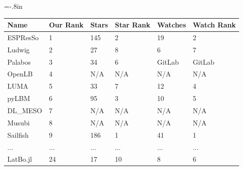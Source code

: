 \documentclass[usenames,dvipsnames]{beamer}
\begin{document}
\hoffset=-.8in %
\begin{frame}[plain]


\begin{tabular}{ p{2.15cm}p{1.25cm}p{1.75cm}p{1.5cm}p{1.75cm}p{1.5cm} }
  \toprule
  Name & Our Rank & Stars & Star Rank &
  Watches & Watch Rank\\
  \midrule
  ESPResSo & 1 & 145 & 2 & 19& 2\\
  Ludwig & 2 & 27 & 8 & 6& 7\\
  Palabos & 3 & 34 & 6 & GitLab& GitLab\\
  OpenLB & 4 & N/A & N/A & N/A& N/A\\
  LUMA & 5 & 33 & 7 & 12& 4\\
  pyLBM & 6 & 95 & 3 & 10& 5\\
  DL\_MESO & 7 & N/A & N/A & N/A & N/A\\
  Musubi & 8 & N/A & N/A & N/A & N/A\\
  Sailfish & 9 & 186 & 1 & 41& 1\\
  ... & ... & ... & ... & ... & ...\\				
  LatBo.jl & 24 & 17 & 10 & 8& 6\\			
  \bottomrule
\end{tabular}
  
\end{frame}
\hoffset=0in %
\end{document}
